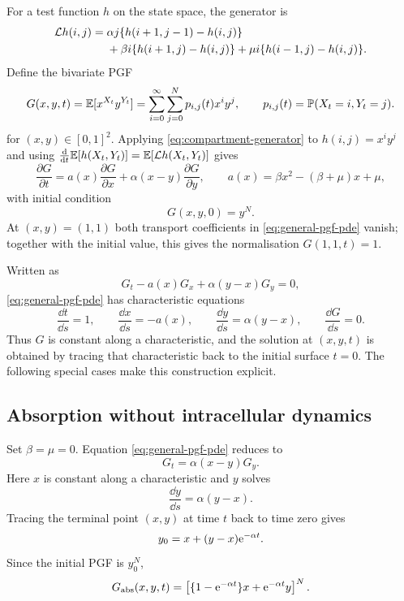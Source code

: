 For a test function $h$ on the state space, the generator is
\begin{align}
  \mathcal{L}h(i,j)
  ={}&\alpha j\{h(i+1,j-1)-h(i,j)\}\notag\\
    &+\beta i\{h(i+1,j)-h(i,j)\}
     +\mu i\{h(i-1,j)-h(i,j)\}.
  \label{eq:compartment-generator}
\end{align}
Define the bivariate PGF
\begin{equation}
  G(x,y,t)
  =\mathbb{E}[x^{X_t}y^{Y_t}]
  =\sum_{i=0}^{\infty}\sum_{j=0}^{N}
     p_{i,j}(t)x^{i}y^{j},
  \qquad
  p_{i,j}(t)=\mathbb{P}(X_t=i,Y_t=j).
  \label{eq:bivariate-pgf}
\end{equation}
for $(x,y)\in[0,1]^2$.
Applying \cref{eq:compartment-generator} to $h(i,j)=x^{i}y^{j}$ and using
$\frac{\mathrm{d}}{\mathrm{d} t}\mathbb{E}[h(X_t,Y_t)]=\mathbb{E}[\mathcal{L}h(X_t,Y_t)]$ gives
\begin{equation}
  \frac{\partial G}{\partial t}
  =a(x)\frac{\partial G}{\partial x}
   +\alpha(x-y)\frac{\partial G}{\partial y},
  \qquad
  a(x)=\beta x^2-(\beta+\mu)x+\mu,
  \label{eq:general-pgf-pde}
\end{equation}
with initial condition
\begin{equation}
  G(x,y,0)=y^N.
  \label{eq:general-pgf-initial}
\end{equation}
At $(x,y)=(1,1)$ both transport coefficients in \cref{eq:general-pgf-pde} vanish; together with the initial value, this gives the normalisation $G(1,1,t)=1$.

Written as
\[
  G_t-a(x)G_x+\alpha(y-x)G_y=0,
\]
\cref{eq:general-pgf-pde} has characteristic equations
\begin{equation}
  \frac{\dd t}{\dd s}=1,
  \qquad
  \frac{\dd x}{\dd s}=-a(x),
  \qquad
  \frac{\dd y}{\dd s}=\alpha(y-x),
  \qquad
  \frac{\dd G}{\dd s}=0.
  \label{eq:general-characteristics}
\end{equation}
Thus $G$ is constant along a characteristic, and the solution at $(x,y,t)$ is obtained by tracing that characteristic back to the initial surface $t=0$.  The following special cases make this construction explicit.

\subsection{Absorption without intracellular dynamics}
\label{sec:absorption-only}

Set $\beta=\mu=0$.  Equation \eqref{eq:general-pgf-pde} reduces to
\begin{equation}
  G_t=\alpha(x-y)G_y.
  \label{eq:absorption-pde}
\end{equation}
Here $x$ is constant along a characteristic and $y$ solves
\[
  \frac{\dd y}{\dd s}=\alpha(y-x).
\]
Tracing the terminal point $(x,y)$ at time $t$ back to time zero gives
\[
  y_0=x+(y-x)\mathrm{e}^{-\alpha t}.
\]
Since the initial PGF is $y_0^N$,
\begin{equation}
  G_{\mathrm{abs}}(x,y,t)
  =\left[\{1-\mathrm{e}^{-\alpha t}\}x+\mathrm{e}^{-\alpha t}y\right]^N.
  \label{eq:absorption-pgf}
\end{equation}

